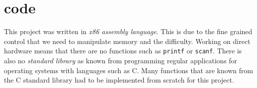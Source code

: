 \section{code}

This project was written in \textit{x86 assembly language}. This is
due to the fine grained control that we need to manipulate memory and
the difficulty. Working on direct hardware means that there are no functions such as \texttt{printf} or \texttt{scanf}. There is also no
\textit{standard library} as known from programming regular applications for operating systems with languages such as C. Many
functions that are known from the C standard library had to be implemented from scratch for this project. 

\begin{lstlisting}[language={[x86masm]Assembler}]


\end{lstlisting}
